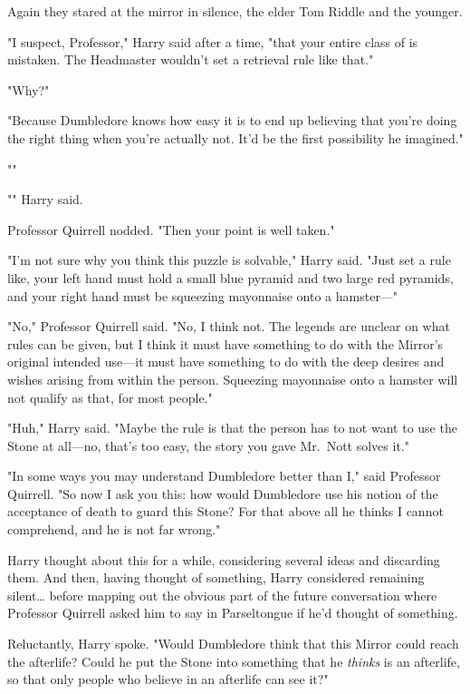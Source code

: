 Again they stared at the mirror in silence, the elder Tom Riddle and the
younger.

"I suspect, Professor," Harry said after a time, "that your entire class of
is mistaken. The Headmaster wouldn't set a retrieval rule like that."

"Why?"

"Because Dumbledore knows how easy it is to end up believing that you're doing
the right thing when you're actually not. It'd be the first possibility he
imagined."

""

"" Harry said.

Professor Quirrell nodded. "Then your point is well taken."

"I'm not sure why you think this puzzle is solvable," Harry said. "Just set a
rule like, your left hand must hold a small blue pyramid and two large red
pyramids, and your right hand must be squeezing mayonnaise onto a hamster---"

"No," Professor Quirrell said. "No, I think not. The legends are unclear on
what rules can be given, but I think it must have something to do with the
Mirror's original intended use---it must have something to do with the deep
desires and wishes arising from within the person. Squeezing mayonnaise onto a
hamster will not qualify as that, for most people."

"Huh," Harry said. "Maybe the rule is that the person has to not want to use
the Stone at all---no, that's too easy, the story you gave Mr.~Nott solves it."

"In some ways you may understand Dumbledore better than I," said Professor
Quirrell. "So now I ask you this: how would Dumbledore use his notion of the
acceptance of death to guard this Stone? For that above all he thinks I cannot
comprehend, and he is not far wrong."

Harry thought about this for a while, considering several ideas and discarding
them. And then, having thought of something, Harry considered remaining
silent{\ldots} before mapping out the obvious part of the future conversation
where Professor Quirrell asked him to say in Parseltongue if he'd thought of
something.

Reluctantly, Harry spoke. "Would Dumbledore think that this Mirror could reach
the afterlife? Could he put the Stone into something that he \emph{thinks} is
an afterlife, so that only people who believe in an afterlife can see it?"


